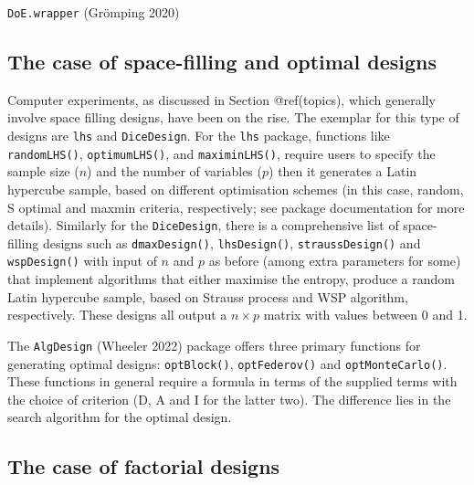 \documentclass{article}
\begin{document}
\texttt{DoE.wrapper} (Grömping 2020)

\hypertarget{the-case-of-space-filling-and-optimal-designs}{%
\subsection{The case of space-filling and optimal
designs}\label{the-case-of-space-filling-and-optimal-designs}}

Computer experiments, as discussed in Section @ref(topics), which
generally involve space filling designs, have been on the rise. The
exemplar for this type of designs are \texttt{lhs} and
\texttt{DiceDesign}. For the \texttt{lhs} package, functions like
\texttt{randomLHS()}, \texttt{optimumLHS()}, and \texttt{maximinLHS()},
require users to specify the sample size (\(n\)) and the number of
variables (\(p\)) then it generates a Latin hypercube sample, based on
different optimisation schemes (in this case, random, S optimal and
maxmin criteria, respectively; see package documentation for more
details). Similarly for the \texttt{DiceDesign}, there is a
comprehensive list of space-filling designs such as
\texttt{dmaxDesign()}, \texttt{lhsDesign()}, \texttt{straussDesign()}
and \texttt{wspDesign()} with input of \(n\) and \(p\) as before (among
extra parameters for some) that implement algorithms that either
maximise the entropy, produce a random Latin hypercube sample, based on
Strauss process and WSP algorithm, respectively. These designs all
output a \(n \times p\) matrix with values between 0 and 1.

The \texttt{AlgDesign} (Wheeler 2022) package offers three primary
functions for generating optimal designs: \texttt{optBlock()},
\texttt{optFederov()} and \texttt{optMonteCarlo()}. These functions in
general require a formula in terms of the supplied terms with the choice
of criterion (D, A and I for the latter two). The difference lies in the
search algorithm for the optimal design.

\hypertarget{the-case-of-factorial-designs}{%
\subsection{The case of factorial
designs}\label{the-case-of-factorial-designs}}
\end{document}
